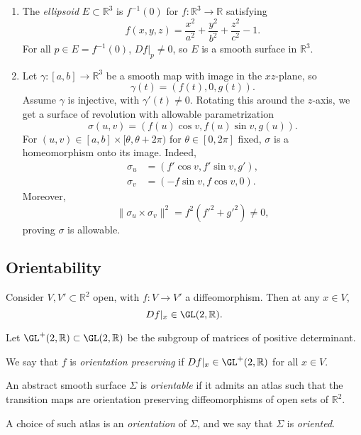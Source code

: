 \documentclass[12pt]{article}
\begin{document}
\begin{exbox}
	\begin{enumerate}[1.]
		\item The \emph{ellipsoid} $E \subset \mathbb{R}^3$ is $f^{-1}(0)$ for $f : \mathbb{R}^3 \to \mathbb{R}$ satisfying
			\[
			f(x, y, z) = \frac{x^2}{a^2} + \frac{y^2}{b^2} + \frac{z^2}{c^2} - 1
			.\]
			For all $p \in E = f^{-1}(0)$, $Df|_p \neq 0$, so $E$ is a smooth surface in $\mathbb{R}^3$.
		\item Let $\gamma : [a, b] \to \mathbb{R}^3$ be a smooth map with image in the $xz$-plane, so
			\[
			\gamma(t) = (f(t), 0, g(t))
			.\]
			Assume $\gamma$ is injective, with $\gamma'(t) \neq 0$. Rotating this around the $z$-axis, we get a surface of revolution with allowable parametrization %
			\[
			\sigma(u, v) = (f(u) \cos v, f(u) \sin v, g(u))
			.\]
			For $(u, v) \in [a, b] \times [\theta, \theta + 2 \pi)$ for $\theta \in [0, 2\pi]$ fixed, $\sigma$ is a homeomorphism onto its image. Indeed,
			\begin{align*}
				\sigma_u &= (f' \cos v, f' \sin v, g'), \\
				\sigma_v &= (-f \sin v, f \cos v, 0).
			\end{align*}
			Moreover,
			\[
			\| \sigma_u \times \sigma_v \|^2 = f^2 (f'^2 + g'^2) \neq 0
			,\]
			proving $\sigma$ is allowable.
	\end{enumerate}
\end{exbox}

\subsection{Orientability}
\label{sub:orientability}

Consider $V, V' \subset \mathbb{R}^2$ open, with $f : V \to V'$ a diffeomorphism. Then at any $x \in V$,
\[
	Df|_x \in \GL(2,\mathbb{R})
.\]

Let $\GL^{+}(2, \mathbb{R}) \subset \GL(2, \mathbb{R})$ be the subgroup of matrices of positive determinant.

\begin{definition}
	We say that $f$ is \emph{orientation preserving} if $Df|_x \in \GL^{+}(2, \mathbb{R})$ for all $x \in V$.
\end{definition}

\begin{definition}
	An abstract smooth surface $\Sigma$ is \emph{orientable} if it admits an atlas such that the transition maps are orientation preserving diffeomorphisms of open sets of $\mathbb{R}^2$.

	A choice of such atlas is an \emph{orientation} of $\Sigma$, and we say that $\Sigma$ is \emph{oriented}.
\end{definition}
\end{document}
